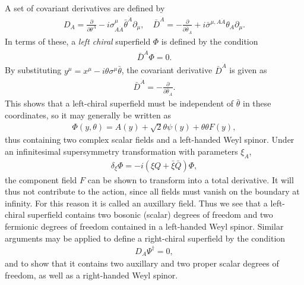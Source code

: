\documentclass[twoside,english]{uiofysmaster}
\begin{document}
 A set of covariant derivatives are defined by
\begin{align}
	D_A = \frac{\partial}{\partial \theta^A} - i\sigma^\mu_{A \dot A}\bar\theta^{\dot A}\partial_\mu, \quad \bar D^{\dot A} = -\frac{\partial}{\partial \bar \theta_{\dot A}} + i\bar\sigma^{\mu,A \dot A}\theta_A \partial_\mu.
\end{align}
In terms of these, a {\it left chiral} superfield $\Phi$ is defined by the condition
\begin{align}
	\bar D^{\dot A} \Phi = 0.
\end{align}
By substituting $y^\mu = x^\mu - i\theta\sigma^\mu \bar \theta$, the covariant derivative $\bar D^{\dot A}$ is given as
\begin{align}
	\bar D^{\dot A} = -\frac{\partial}{\partial \bar\theta_{\dot A}}.
\end{align}
This shows that a left-chiral superfield must be independent of $\bar \theta$ in these coordinates, so it may generally be written as
\begin{align}
	\Phi(y, \theta) = A(y) + \sqrt{2}\theta\psi(y) + \theta\theta F(y), 
\end{align}
thus containing two complex scalar fields and a left-handed Weyl spinor. Under an infinitesimal supersymmetry transformation with parameters $\xi_A$,
\begin{align}
	\delta_\xi \Phi = -i(\xi Q + \bar\xi\bar Q)\Phi,
\end{align}
the component field $F$ can be shown to transform into a total derivative. It will thus not contribute to the action, since all fields must vanish on the boundary at infinity. For this reason it is called an auxillary field. Thus we see that a left-chiral superfield contains two bosonic (scalar) degrees of freedom and two fermionic degrees of freedom contained in a left-handed Weyl spinor. Similar arguments may be applied to define a right-chiral superfield by the condition
\begin{align}
	D_A \Psi^\dag = 0,
\end{align}
and to show that it contains two auxillary and two proper scalar degrees of freedom, as well as a right-handed Weyl spinor. 
\end{document}
